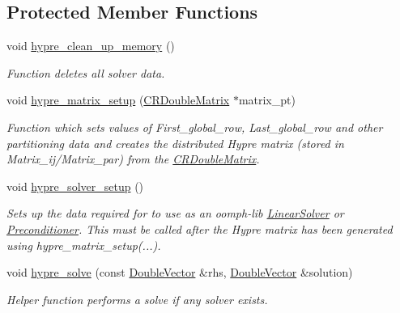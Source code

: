 \subsection*{Protected Member Functions}
\begin{DoxyCompactItemize}
\item 
void \hyperlink{classoomph_1_1HypreInterface_a989fc83bc47f7b4fb8a753b16a26a012}{hypre\+\_\+clean\+\_\+up\+\_\+memory} ()
\begin{DoxyCompactList}\small\item\em Function deletes all solver data. \end{DoxyCompactList}\item 
void \hyperlink{classoomph_1_1HypreInterface_aebc23d169937d5e6a5b492710843ae7b}{hypre\+\_\+matrix\+\_\+setup} (\hyperlink{classoomph_1_1CRDoubleMatrix}{C\+R\+Double\+Matrix} $\ast$matrix\+\_\+pt)
\begin{DoxyCompactList}\small\item\em Function which sets values of First\+\_\+global\+\_\+row, Last\+\_\+global\+\_\+row and other partitioning data and creates the distributed Hypre matrix (stored in Matrix\+\_\+ij/\+Matrix\+\_\+par) from the \hyperlink{classoomph_1_1CRDoubleMatrix}{C\+R\+Double\+Matrix}. \end{DoxyCompactList}\item 
void \hyperlink{classoomph_1_1HypreInterface_afeddc250f9c56ac94e8c013c23a69deb}{hypre\+\_\+solver\+\_\+setup} ()
\begin{DoxyCompactList}\small\item\em Sets up the data required for to use as an oomph-\/lib \hyperlink{classoomph_1_1LinearSolver}{Linear\+Solver} or \hyperlink{classoomph_1_1Preconditioner}{Preconditioner}. This must be called after the Hypre matrix has been generated using hypre\+\_\+matrix\+\_\+setup(...). \end{DoxyCompactList}\item 
void \hyperlink{classoomph_1_1HypreInterface_a5cdd3f8621333e94d8a1004611bc6793}{hypre\+\_\+solve} (const \hyperlink{classoomph_1_1DoubleVector}{Double\+Vector} \&rhs, \hyperlink{classoomph_1_1DoubleVector}{Double\+Vector} \&solution)
\begin{DoxyCompactList}\small\item\em Helper function performs a solve if any solver exists. \end{DoxyCompactList}\end{DoxyCompactItemize}
